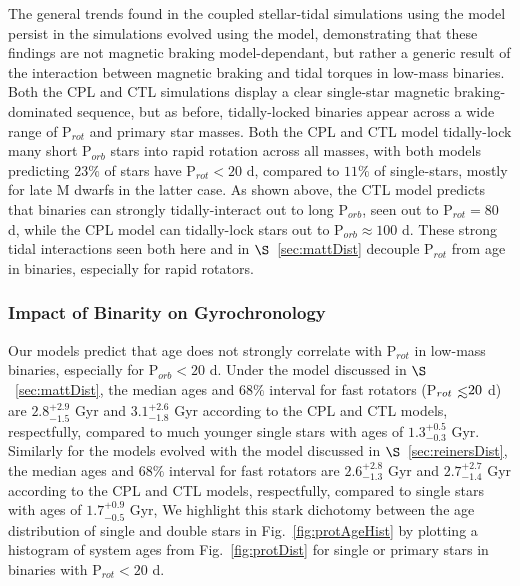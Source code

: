 \documentclass[twocolumn]{aastex61}
\def\lsim{~\rlap{$<$}{\lower 1.0ex\hbox{$\sim$}}}
\begin{document}
The general trends found in the coupled stellar-tidal simulations using the \citet{Matt2015} model persist in the simulations evolved using the \citet{Reiners2012} model, demonstrating that these findings are not magnetic braking model-dependant, but rather a generic result of the interaction between magnetic braking and tidal torques in low-mass binaries. Both the CPL and CTL simulations display a clear single-star magnetic braking-dominated sequence, but as before, tidally-locked binaries appear across a wide range of P$_{rot}$ and primary star masses. Both the CPL and CTL model tidally-lock many short P$_{orb}$ stars into rapid rotation across all masses, with both models predicting $23\%$ of stars have P$_{rot} < 20$ d, compared to $11\%$ of single-stars, mostly for late M dwarfs in the latter case. As shown above, the CTL model predicts that binaries can strongly tidally-interact out to long P$_{orb}$, seen out to P$_{rot} = 80$ d, while the CPL model can tidally-lock stars out to P$_{orb} \approx 100$ d. These strong tidal interactions seen both here and in $\S$~\ref{sec:mattDist} decouple P$_{rot}$ from age in binaries, especially for rapid rotators. 

\subsubsection{Impact of Binarity on Gyrochronology}

Our models predict that age does not strongly correlate with P$_{rot}$ in low-mass binaries, especially for P$_{orb} < 20 $ d. Under the \citet{Matt2015} model discussed in $\S$~\ref{sec:mattDist}, the median ages and $68\%$ interval for fast rotators (P$_{rot} \lsim 20$ d) are $2.8^{+2.9}_{-1.5}$ Gyr and $3.1^{+2.6}_{-1.8}$ Gyr according to the CPL and CTL models, respectfully, compared to much younger single stars with ages of $1.3^{+0.5}_{-0.3}$ Gyr. Similarly for the models evolved with the \citet{Reiners2012} model discussed in $\S$~\ref{sec:reinersDist}, the median ages and $68\%$ interval for fast rotators are $2.6^{+2.8}_{-1.3}$ Gyr and $2.7^{+2.7}_{-1.4}$ Gyr according to the CPL and CTL models, respectfully, compared to single stars with ages of $1.7^{+0.9}_{-0.5}$ Gyr, We highlight this stark dichotomy between the age distribution of single and double stars in Fig.~\ref{fig:protAgeHist} by plotting a histogram of system ages from Fig.~\ref{fig:protDist} for single or primary stars in binaries with P$_{rot} < 20$ d.  
\end{document}
